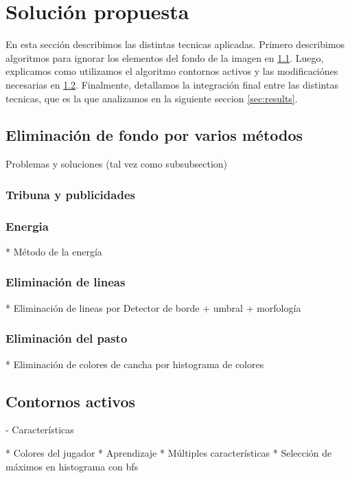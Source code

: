 \section{Solución propuesta}
\label{sec:solution}

En esta sección describimos las distintas tecnicas aplicadas. Primero describimos algoritmos para
ignorar los elementos del fondo de la imagen en \ref{sec:background-elimination}. Luego, explicamos
como utilizamos el algoritmo contornos activos\cite{fast-level-set} y las modificaciónes necesarias
en \ref{sec:ac}. Finalmente, detallamos la integración final entre las distintas tecnicas, que es
la que analizamos en la siguiente seccion \ref{sec:results}.

\subsection{Eliminación de fondo por varios métodos}
\label{sec:background-elimination}
Problemas y soluciones (tal vez como subsubsection)

\subsubsection{Tribuna y publicidades}

\subsubsection{Energia}
  * Método de la energía

\subsubsection{Eliminación de lineas}
  * Eliminación de lineas por Detector de borde + umbral + morfología

\subsubsection{Eliminación del pasto}
  * Eliminación de colores de cancha por histograma de colores


\subsection{Contornos activos}
\label{sec:ac}

- Características

  * Colores del jugador
  * Aprendizaje
  * Múltiples características
  * Selección de máximos en histograma con bfs


